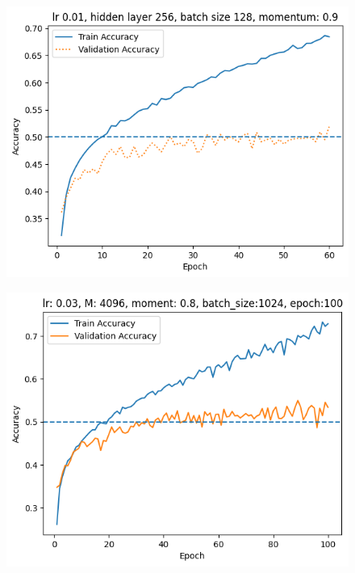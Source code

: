 \begin{figure}[!ht]
    \centering\includegraphics[width=1\linewidth]{A5-0.png}
\end{figure}
\begin{figure}[!ht]
    \centering\includegraphics[width=1\linewidth]{A5-1.png}
\end{figure}
